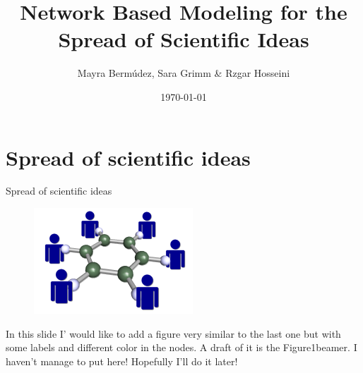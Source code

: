 \documentclass{beamer}
\title[Short title of the talk]{Network Based Modeling for the Spread of Scientific Ideas }
\author{Mayra Berm\'udez, Sara Grimm \& Rzgar Hosseini}
\institute[U of X]
{ ETH Zurich \\
\medskip
}
\date{\today}
\begin{document}
%
\begin{frame}
\titlepage
\end{frame}
%
\begin{frame}
\tableofcontents[pausesections]
\end{frame}

%









\section{Spread of scientific ideas}
\begin{frame}
{Spread of scientific ideas}
\begin{figure}
[htp]
\begin{center}
\includegraphics{science_network_150}
\end{center}
\label {fig1}
\end{figure}
\end{frame}
%
\begin{frame}
In this slide I' would like to add a figure very similar to the last one but with some labels and different color in the nodes. A draft of it is the Figure1beamer. I haven't manage to put here! Hopefully I'll do it later!
\end{frame}
%
\end{document}
